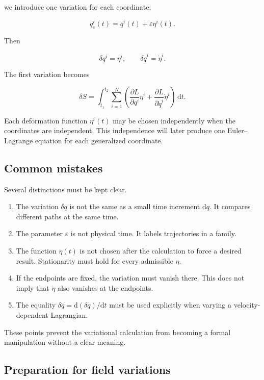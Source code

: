we introduce one variation for each coordinate:

\[
q^{i}_{\varepsilon}(t)
=
q^{i}(t)+\varepsilon\eta^{i}(t).
\]

Then

\[
\delta q^{i}=\eta^{i},
\qquad
\delta\dot q^{i}=\dot\eta^{i}.
\]

The first variation becomes

\[
\delta S
=
\int_{t_{1}}^{t_{2}}
\sum_{i=1}^{N}
\left(
\frac{\partial L}{\partial q^{i}}\eta^{i}
+
\frac{\partial L}{\partial\dot q^{i}}\dot\eta^{i}
\right)
\,\mathrm{d}t.
\]

Each deformation function \(\eta^{i}(t)\) may be chosen independently when the coordinates are independent. This independence will later produce one Euler--Lagrange equation for each generalized coordinate.

\subsection{Common mistakes}

Several distinctions must be kept clear.

\begin{enumerate}
    \item The variation \(\delta q\) is not the same as a small time increment \(\mathrm{d}q\). It compares different paths at the same time.
    \item The parameter \(\varepsilon\) is not physical time. It labels trajectories in a family.
    \item The function \(\eta(t)\) is not chosen after the calculation to force a desired result. Stationarity must hold for every admissible \(\eta\).
    \item If the endpoints are fixed, the variation must vanish there. This does not imply that \(\dot\eta\) also vanishes at the endpoints.
    \item The equality \(\delta\dot q=\mathrm{d}(\delta q)/\mathrm{d}t\) must be used explicitly when varying a velocity-dependent Lagrangian.
\end{enumerate}

These points prevent the variational calculation from becoming a formal manipulation without a clear meaning.

\subsection{Preparation for field variations}

